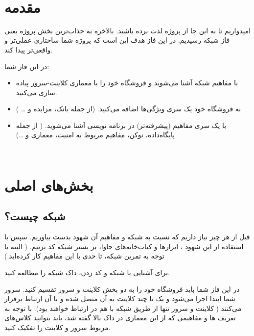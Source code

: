 \documentclass[]{article}
\begin{document}
\newpage



 \Large \textbf{\\
}

\section*{{\titr مقدمه}}
امیدواریم تا به این جا از پروژه لذت برده باشید. بالاخره به جذاب‌ترین بخش پروژه یعنی فاز شبکه رسیدیم. در این فاز هدف این است که پروژه شما ساختاری عملی‌تر و واقعی‌تر پیدا کند.

در این فاز شما:

\begin{itemize}


\item
 با مفاهیم شبکه آشنا می‌شوید و فروشگاه خود را با معماری کلاینت-سرور پیاده سازی می‌کنید.
 
 \item
 
به فروشگاه خود یک سری ویژگی‌ها اضافه می‌کنید. (از جمله بانک، مزایده و … )

\item
با یک سری مفاهیم (پیشرفته‌تر)‌ در برنامه نویسی آشنا می‌شوید. ( از جمله پایگاه‌داده، توکن، مفاهیم مربوط به امنیت، معماری  و …)

\end{itemize}
\newpage



 \Large \textbf{\\
}
\section*{{\titr بخش‌های اصلی }}

\subsection*{{\titr شبکه چیست؟}}

قبل از هر چیز نیاز داریم که نسبت به شبکه و مفاهیم آن شهود بدست بیاوریم. سپس با استفاده از این شهود ، ابزار‌ها و کتاب‌خانه‌های جاوا، بر بستر شبکه کد بزنیم. ( البته با توجه به تمرین شبکه، تا حدی با این مفاهیم کار کرده‌اید.)


برای آشنایی با شبکه و کد زدن، \textcolor{CustomColor}{داک شبکه} را مطالعه کنید.


در این فاز شما باید فروشگاه خود را به دو بخش کلاینت و سرور تقسیم کنید. سرور شما ابتدا اجرا می‌شود و یک تا چند کلاینت به آن متصل شده و با آن ارتباط برقرار می‌کنند ( کلاینت و سرور تنها از طریق شبکه با هم در ارتباط خواهند بود). با توجه به تعریف ها و مفاهیمی که از این معماری در داک بالا گفته شد، باید  بتوانید کلاس‌های مربوط سرور و کلاینت را تفکیک کنید.
\end{document}
